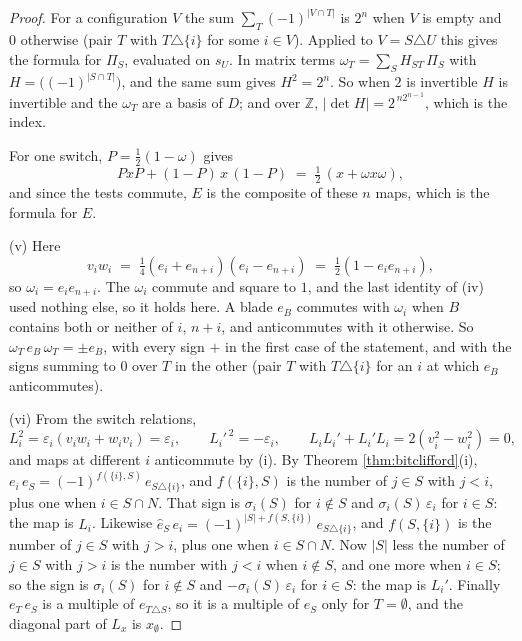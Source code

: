 \documentclass[11pt]{article}
\theoremstyle{plain}
\theoremstyle{definition}
\theoremstyle{plain}
\theoremstyle{definition}
\newcommand{\Z}{\mathbb{Z}}
\begin{document}
\begin{proof}
For a configuration $V$ the sum $\sum_{T}(-1)^{|V \cap T|}$ is $2^{n}$ when $V$ is empty and $0$ otherwise (pair $T$ with $T \triangle \{i\}$ for some $i \in V$). Applied to $V = S \triangle U$ this gives the formula for $\Pi_{S}$, evaluated on $s_{U}$. In matrix terms $\omega_{T} = \sum_{S} H_{ST}\,\Pi_{S}$ with $H = \bigl((-1)^{|S \cap T|}\bigr)$, and the same sum gives $H^{2} = 2^{n}$. So when $2$ is invertible $H$ is invertible and the $\omega_{T}$ are a basis of $D$; and over $\Z$, $|\det H| = 2^{\,n2^{n-1}}$, which is the index.

For one switch, $P = \tfrac12(1 - \omega)$ gives
\[
PxP + (1-P)\,x\,(1-P) \;=\; \tfrac12\,(x + \omega x \omega),
\]
and since the tests commute, $E$ is the composite of these $n$ maps, which is the formula for $E$.

(v) Here
\[
v_{i}w_{i} \;=\; \tfrac14(e_{i} + e_{n+i})(e_{i} - e_{n+i}) \;=\; \tfrac12(1 - e_{i}e_{n+i}),
\]
so $\omega_{i} = e_{i}e_{n+i}$. The $\omega_{i}$ commute and square to $1$, and the last identity of (iv) used nothing else, so it holds here. A blade $e_{B}$ commutes with $\omega_{i}$ when $B$ contains both or neither of $i$, $n+i$, and anticommutes with it otherwise. So $\omega_{T}\,e_{B}\,\omega_{T} = \pm e_{B}$, with every sign $+$ in the first case of the statement, and with the signs summing to $0$ over $T$ in the other (pair $T$ with $T \triangle \{i\}$ for an $i$ at which $e_{B}$ anticommutes).

(vi) From the switch relations,
\[
L_{i}^{2} = \varepsilon_{i}(v_{i}w_{i} + w_{i}v_{i}) = \varepsilon_{i}, \qquad
L_{i}'^{\,2} = -\varepsilon_{i}, \qquad
L_{i}L_{i}' + L_{i}'L_{i} = 2(v_{i}^{2} - w_{i}^{2}) = 0,
\]
and maps at different $i$ anticommute by (i). By Theorem \ref{thm:bitclifford}(i), $e_{i}\,e_{S} = (-1)^{f(\{i\},S)}\,e_{S \triangle \{i\}}$, and $f(\{i\},S)$ is the number of $j \in S$ with $j < i$, plus one when $i \in S \cap N$. That sign is $\sigma_{i}(S)$ for $i \notin S$ and $\sigma_{i}(S)\,\varepsilon_{i}$ for $i \in S$: the map is $L_{i}$. Likewise $\hat{e}_{S}\,e_{i} = (-1)^{|S| + f(S,\{i\})}\,e_{S \triangle \{i\}}$, and $f(S,\{i\})$ is the number of $j \in S$ with $j > i$, plus one when $i \in S \cap N$. Now $|S|$ less the number of $j \in S$ with $j > i$ is the number with $j < i$ when $i \notin S$, and one more when $i \in S$; so the sign is $\sigma_{i}(S)$ for $i \notin S$ and $-\sigma_{i}(S)\,\varepsilon_{i}$ for $i \in S$: the map is $L_{i}'$. Finally $e_{T}\,e_{S}$ is a multiple of $e_{T \triangle S}$, so it is a multiple of $e_{S}$ only for $T = \emptyset$, and the diagonal part of $L_{x}$ is $x_{\emptyset}$.
\end{proof}
\end{document}
